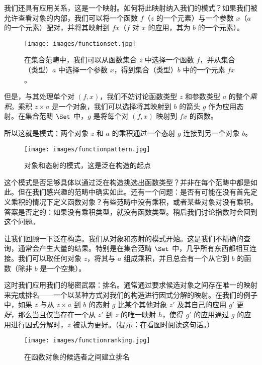我们还具有应用关系，这是一个映射。如何将此映射纳入我们的模式？如果我们被允许查看对象的内部，我们可以将一个函数 $f$（$z$ 的一个元素）与一个参数 $x$（$a$ 的一个元素）配对，并将其映射到 $f x$（$f$ 对 $x$ 的应用，其为 $b$ 的一个元素）。

\begin{figure}[H]
  \centering\texttt{[image: images/functionset.jpg]}
  \caption{在集合范畴中，我们可以从函数集合 $z$ 中选择一个函数 $f$，并从集合（类型）$a$ 中选择一个参数 $x$，得到集合（类型）$b$ 中的一个元素 $f x$。}
\end{figure}

\noindent
但是，与其处理单个对 $(f, x)$，我们不妨讨论函数类型 $z$ 和参数类型 $a$ 的整个\emph{乘积}。乘积 $z\times{}a$ 是一个对象，我们可以选择将其映射到 $b$ 的箭头 $g$ 作为应用态射。在集合范畴 $\Set$ 中，$g$ 是将每个对 $(f, x)$ 映射到 $f x$ 的函数。

所以这就是模式：两个对象 $z$ 和 $a$ 的乘积通过一个态射 $g$ 连接到另一个对象 $b$。

\begin{figure}[H]
  \centering
  \texttt{[image: images/functionpattern.jpg]}
  \caption{对象和态射的模式，这是泛在构造的起点}
\end{figure}

\noindent
这个模式是否足够具体以通过泛在构造挑选出函数类型？并非在每个范畴中都是如此。但在我们感兴趣的范畴中确实如此。还有一个问题：是否有可能在没有首先定义乘积的情况下定义函数对象？有些范畴中没有乘积，或者某些对象对没有乘积。答案是否定的：如果没有乘积类型，就没有函数类型。稍后我们讨论指数时会回到这个问题。

让我们回顾一下泛在构造。我们从对象和态射的模式开始。这是我们不精确的查询，通常会产生大量的结果。特别是在集合范畴 $\Set$ 中，几乎所有东西都相互连接。我们可以取任何对象 $z$，将其与 $a$ 组成乘积，并且总会有一个从它到 $b$ 的函数（除非 $b$ 是一个空集）。

这时我们应用我们的秘密武器：排名。通常通过要求候选对象之间存在唯一的映射来完成排名——一个以某种方式对我们的构造进行因式分解的映射。在我们的例子中，如果 $z$ 与从 $z \times a$ 到 $b$ 的态射 $g$ 比某个其他对象 $z'$ 及其自己的应用 $g'$ 更\emph{好}，那么当且仅当存在一个从 $z'$ 到 $z$ 的唯一映射 $h$，使得 $g'$ 的应用通过 $g$ 的应用进行因式分解时，$z$ 被认为更好。（提示：在看图时阅读这句话。）

\begin{figure}[H]
  \centering
  \texttt{[image: images/functionranking.jpg]}
  \caption{在函数对象的候选者之间建立排名}
\end{figure}

